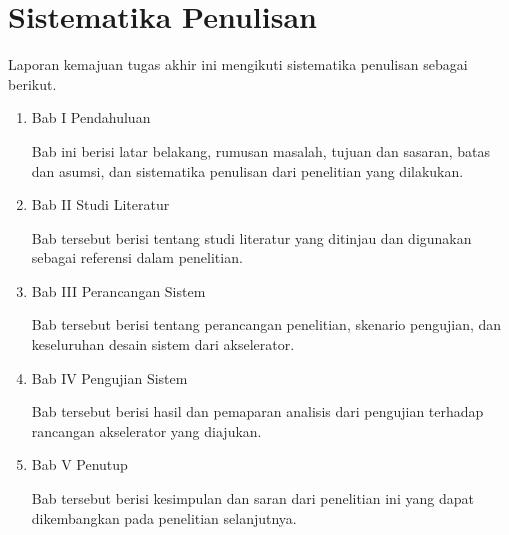 \section{Sistematika Penulisan}

Laporan kemajuan tugas akhir ini mengikuti sistematika penulisan sebagai berikut.

\begin{enumerate}
	\item Bab I Pendahuluan

	      Bab ini berisi latar belakang, rumusan masalah, tujuan dan sasaran, batas dan asumsi, dan sistematika penulisan dari penelitian yang dilakukan.

	\item Bab II Studi Literatur

	      Bab tersebut berisi tentang studi literatur yang ditinjau dan digunakan sebagai referensi dalam penelitian.

	\item Bab III Perancangan Sistem

	      Bab tersebut berisi tentang perancangan penelitian, skenario pengujian, dan keseluruhan desain sistem dari akselerator.

	\item Bab IV Pengujian Sistem

	      Bab tersebut berisi hasil dan pemaparan analisis dari pengujian terhadap rancangan akselerator yang diajukan.

	\item Bab V Penutup

	      Bab tersebut berisi kesimpulan dan saran dari penelitian ini yang dapat dikembangkan pada penelitian selanjutnya.
\end{enumerate}
